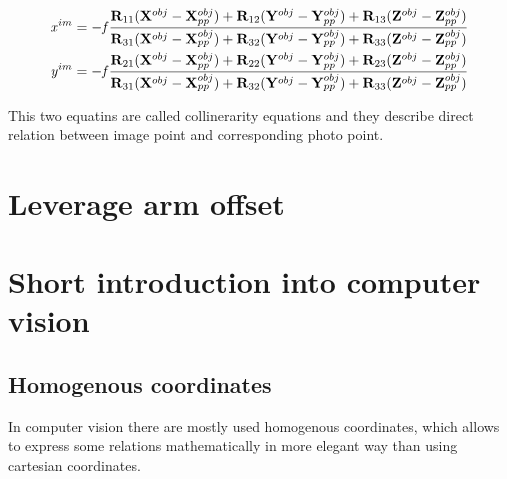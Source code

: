 \documentclass[a4paper,12pt]{report}
\newcommand{\ematr}[1]{
{\bf #1}
}
\newcommand{\evect}[1]{
{\bf #1}
}
\newcommand{\escal}[1]{
{\it #1}
}
\begin{document}
\begin{equation}
\label{eq:col_eqs}
\begin{split}
&\escal{x}^{im} = -\escal{f}\frac{\ematr{R}_{11}(\evect{X}^{obj} - \evect{X}^{obj}_{pp}) + 
                                  \ematr{R}_{12}(\evect{Y}^{obj} - \evect{Y}^{obj}_{pp}) + 
                                  \ematr{R}_{13}(\evect{Z}^{obj} - \evect{Z}^{obj}_{pp})                                  
                                  }{
				  \ematr{R}_{31}(\evect{X}^{obj} - \evect{X}^{obj}_{pp}) + 
                                  \ematr{R}_{32}(\evect{Y}^{obj} - \evect{Y}^{obj}_{pp}) + 
                                  \ematr{R}_{33}(\evect{Z}^{obj} - \evect{Z}^{obj}_{pp})     
                                  } \\
&\escal{y}^{im} = -\escal{f}\frac{\ematr{R}_{21}(\evect{X}^{obj} - \evect{X}^{obj}_{pp}) + 
                                  \ematr{R}_{22}(\evect{Y}^{obj} - \evect{Y}^{obj}_{pp}) + 
                                  \ematr{R}_{23}(\evect{Z}^{obj} - \evect{Z}^{obj}_{pp})                                  
                                  }{
				  \ematr{R}_{31}(\evect{X}^{obj} - \evect{X}^{obj}_{pp}) + 
                                  \ematr{R}_{32}(\evect{Y}^{obj} - \evect{Y}^{obj}_{pp}) + 
                                  \ematr{R}_{33}(\evect{Z}^{obj} - \evect{Z}^{obj}_{pp})     
                                  }
\end{split}
\end{equation}

This two equatins are called collinerarity equations and they describe direct relation between image point and corresponding photo point.

\section{Leverage arm offset}


\section{Short introduction into computer vision}
\subsection{Homogenous coordinates}


In computer vision there are mostly used homogenous coordinates, which allows to express some relations
mathematically in more elegant way than using cartesian coordinates. 
\end{document}
